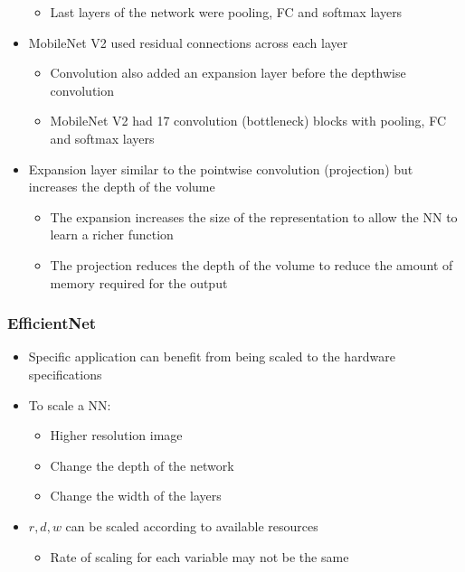 \documentclass[12pt, letterpaper]{article}
\begin{document}
\begin{itemize}
\begin{itemize}
            \item Last layers of the network were pooling, FC and softmax layers 
        \end{itemize}
        \item MobileNet V2 used residual connections across each layer
        \begin{itemize}
            \item Convolution also added an expansion layer before the depthwise convolution 
            \item MobileNet V2 had 17 convolution (bottleneck) blocks with pooling, FC and softmax layers
        \end{itemize}
        \item Expansion layer similar to the pointwise convolution (projection) but increases the depth of the volume
        \begin{itemize}
            \item The expansion increases the size of the representation to allow the NN to learn a richer function
            \item The projection reduces the depth of the volume to reduce the amount of memory required for the output
        \end{itemize}
    \end{itemize}

    \subsubsection{EfficientNet}
    \begin{itemize}
        \item Specific application can benefit from being scaled to the hardware specifications
        \item To scale a NN:
        \begin{itemize}
            \item Higher resolution image
            \item Change the depth of the network
            \item Change the width of the layers
        \end{itemize} 
        \item $r,d,w$ can be scaled according to available resources
        \begin{itemize}
            \item Rate of scaling for each variable may not be the same
        \end{itemize}
    \end{itemize}
\end{document}
